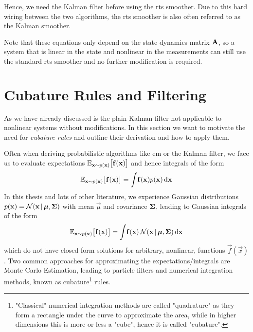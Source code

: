 		Hence, we need the Kalman filter before using the \ac{rts} smoother. Due to this hard wiring between the two algorithms, the \ac{rts} smoother is also often referred to as the Kalman smoother.

		Note that these equations only depend on the state dynamics matrix \( \boldsymbol{\mathrm{A}} \), so a system that is linear in the state and nonlinear in the measurements can still use the standard \ac{rts} smoother and no further modification is required.

\section{Cubature Rules and Filtering}
	\label{sec:cubatureRules}

	As we have already discussed is the plain Kalman filter not applicable to nonlinear systems without modifications. In this section we want to motivate the need for \emph{cubature rules} and outline their derivation and how to apply them.

	Often when deriving probabilistic algorithms like \ac{em} or the Kalman filter, we face us to evaluate expectations \( \mathbb{E}_{\boldsymbol{\mathrm{x}} \sim p(\boldsymbol{\mathrm{x}})}\big[ \boldsymbol{\mathrm{f}}(\boldsymbol{\mathrm{x}}) \big] \) and hence integrals of the form
	\begin{equation*}
		\mathbb{E}_{\boldsymbol{\mathrm{x}} \sim p(\boldsymbol{\mathrm{x}})}\big[ \boldsymbol{\mathrm{f}}(\boldsymbol{\mathrm{x}}) \big] = \int\! \boldsymbol{\mathrm{f}}(\boldsymbol{\mathrm{x}}) p(\boldsymbol{\mathrm{x}}) \dd{\boldsymbol{\mathrm{x}}}
	\end{equation*}
	In this thesis and lots of other literature, we experience Gaussian distributions \( p(\boldsymbol{\mathrm{x}}) = \mathcal{N}(\boldsymbol{\mathrm{x}} \,\vert\, \boldsymbol{\mathrm{\mu}}, \boldsymbol{\mathrm{\Sigma}}) \) with mean \(\vec{\mu}\) and covariance \(\boldsymbol{\mathrm{\Sigma}}\), leading to Gaussian integrals of the form
	\begin{equation*}
		\mathbb{E}_{\boldsymbol{\mathrm{x}} \sim p(\boldsymbol{\mathrm{x}})}\big[ \boldsymbol{\mathrm{f}}(\boldsymbol{\mathrm{x}}) \big] = \int\! \boldsymbol{\mathrm{f}}(\boldsymbol{\mathrm{x}}) \, \mathcal{N}(\boldsymbol{\mathrm{x}} \,\vert\, \boldsymbol{\mathrm{\mu}}, \boldsymbol{\mathrm{\Sigma}}) \dd{\boldsymbol{\mathrm{x}}}
	\end{equation*}
	which do not have closed form solutions for arbitrary, nonlinear, functions \( \vec{f}(\vec{x}) \). Two common approaches for approximating the expectations/integrals are Monte Carlo Estimation, leading to particle filters and numerical integration methods, known as cubature\footnote{"Classical" numerical integration methods are called "quadrature" as they form a rectangle under the curve to approximate the area, while in higher dimensions this is more or less a "cube", hence it is called "cubature".} rules.

